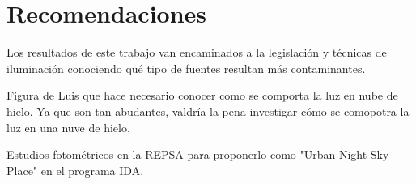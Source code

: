 \chapter{Recomendaciones}
\label{chap:recomendaciones}

Los resultados de este trabajo van encaminados a la legislación y técnicas de iluminación conociendo qué tipo de fuentes resultan más contaminantes. 

Figura de Luis que hace necesario conocer como se comporta la luz en nube de hielo. Ya que son tan abudantes, valdría la pena investigar cómo se comopotra la luz en una nuve de hielo. 

Estudios fotométricos en la REPSA para proponerlo como "Urban Night Sky Place" en el programa IDA.